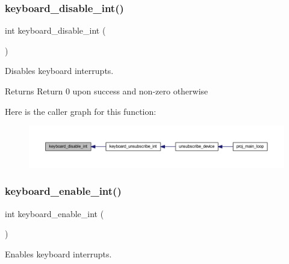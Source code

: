 \subsubsection{\texorpdfstring{keyboard\+\_\+disable\+\_\+int()}{keyboard\_disable\_int()}}
{\footnotesize\ttfamily int keyboard\+\_\+disable\+\_\+int (\begin{DoxyParamCaption}{ }\end{DoxyParamCaption})}



Disables keyboard interrupts. 

\begin{DoxyReturn}{Returns}
Return 0 upon success and non-\/zero otherwise 
\end{DoxyReturn}
Here is the caller graph for this function\+:\nopagebreak
\begin{figure}[H]
\begin{center}
\leavevmode
\includegraphics[width=350pt]{group__keyboard_ga6d0b21990c1bc497f6986367d485af52_icgraph}
\end{center}
\end{figure}
\mbox{\label{group__keyboard_gaeb94e69ca92a37bc52ec381aa3ea5c70}} 
\subsubsection{\texorpdfstring{keyboard\+\_\+enable\+\_\+int()}{keyboard\_enable\_int()}}
{\footnotesize\ttfamily int keyboard\+\_\+enable\+\_\+int (\begin{DoxyParamCaption}{ }\end{DoxyParamCaption})}



Enables keyboard interrupts. 

